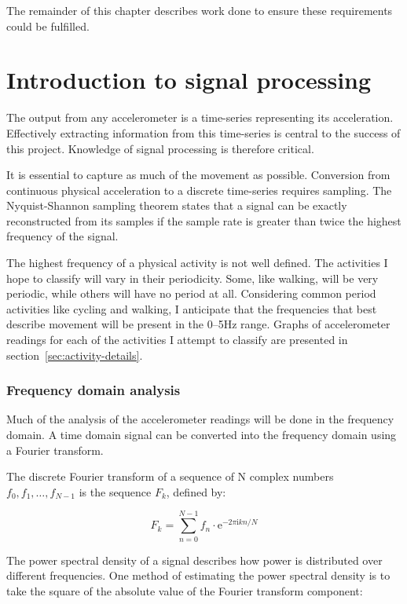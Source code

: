     The remainder of this chapter describes work done to ensure these requirements could be fulfilled.
  
  \section{Introduction to signal processing}
    The output from any accelerometer is a time-series representing its acceleration. Effectively extracting information from this time-series is central to the success of this project. Knowledge of signal processing is therefore critical.
    
    It is essential to capture as much of the movement as possible. Conversion from continuous 
    physical acceleration to a discrete time-series requires sampling. The Nyquist-Shannon sampling theorem states that a signal can be exactly reconstructed from its samples if the sample rate is greater than twice the highest frequency of the signal.
    
    The highest frequency of a physical activity is not well defined. The activities I hope to classify will vary in their periodicity. Some, like walking, will be very periodic, while others will have no period at all. Considering common period activities like cycling and walking, I anticipate that the frequencies that best describe movement will be present in the 0--5\si{Hz} range. Graphs of accelerometer readings for each of the activities I attempt to classify are presented in section~\ref{sec:activity-details}. 
    
    \subsubsection{Frequency domain analysis}
      Much of the analysis of the accelerometer readings will be done in the frequency domain. A time domain signal can be converted into the frequency domain using a Fourier transform.
      
      The discrete Fourier transform of a sequence of N complex numbers $f_0, f_1, \ldots, f_{N-1}$ is the sequence $F_k$, defined by:
      
      $$F_k = \sum\limits_{n=0}^{N-1} f_n \cdot \mathrm{e}^{-2\pi \mathrm{i} kn/N}$$
      
      The power spectral density of a signal describes how power is distributed over different frequencies. One method of estimating the power spectral density is to take the square of the absolute value of the Fourier transform component:
      
